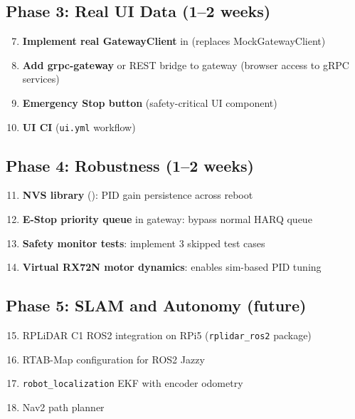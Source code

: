 \documentclass[12pt,a4paper]{article}
\newcommand{\filepath}[1]{\textcolor{dirgreen}{\texttt{\seqsplit{#1}}}}
\begin{document}
\subsection{Phase 3: Real UI Data (1--2 weeks)}

\begin{enumerate}[noitemsep]
  \setcounter{enumi}{6}
  \item \textbf{Implement real GatewayClient} in \filepath{star-ui/} (replaces MockGatewayClient)
  \item \textbf{Add grpc-gateway} or REST bridge to gateway (browser access to gRPC services)
  \item \textbf{Emergency Stop button} (safety-critical UI component)
  \item \textbf{UI CI} (\texttt{ui.yml} workflow)
\end{enumerate}

\subsection{Phase 4: Robustness (1--2 weeks)}

\begin{enumerate}[noitemsep]
  \setcounter{enumi}{10}
  \item \textbf{NVS library} (\filepath{libs/rx\_nvs/}): PID gain persistence across reboot
  \item \textbf{E-Stop priority queue} in gateway: bypass normal HARQ queue
  \item \textbf{Safety monitor tests}: implement 3 skipped test cases
  \item \textbf{Virtual RX72N motor dynamics}: enables sim-based PID tuning
\end{enumerate}

\subsection{Phase 5: SLAM and Autonomy (future)}

\begin{enumerate}[noitemsep]
  \setcounter{enumi}{14}
  \item RPLiDAR C1 ROS2 integration on RPi5 (\texttt{rplidar\_ros2} package)
  \item RTAB-Map configuration for ROS2 Jazzy
  \item \texttt{robot\_localization} EKF with encoder odometry
  \item Nav2 path planner
\end{enumerate}
\end{document}
